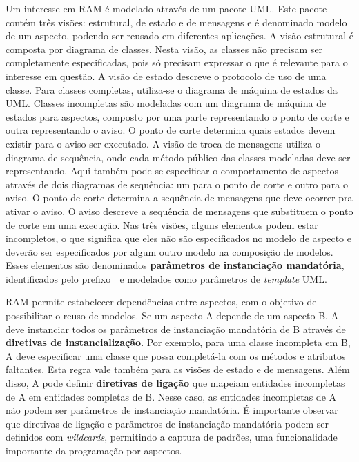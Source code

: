 Um interesse em RAM é modelado através de um pacote UML. Este pacote contém três visões: estrutural, de estado e de mensagens e é denominado modelo de
um aspecto, podendo ser reusado em diferentes aplicações. A visão estrutural é composta por diagrama de classes. Nesta visão, as classes não precisam
ser completamente especificadas, pois só precisam expressar o que é relevante para o interesse em questão. A visão de estado descreve o protocolo de
uso de uma classe. Para classes completas, utiliza-se o diagrama de máquina de estados da UML. Classes incompletas são modeladas com um diagrama de
máquina de estados para aspectos, composto por uma parte representando o ponto de corte e outra representando o aviso. O ponto de corte determina
quais estados devem existir para o aviso ser executado. A visão de troca de mensagens utiliza o diagrama de sequência, onde cada método público das
classes modeladas deve ser representando. Aqui também pode-se especificar o comportamento de aspectos através de dois diagramas de sequência:
um para o ponto de corte e outro para o aviso. O ponto de corte determina a sequência de mensagens que deve ocorrer pra ativar o aviso. O aviso
descreve a sequência de mensagens que substituem o ponto de corte em uma execução. Nas três visões, alguns elementos podem estar incompletos, o que
significa que eles não são especificados no modelo de aspecto e deverão ser especificados por algum outro modelo na composição de modelos. Esses
elementos são denominados \textbf{parâmetros de instanciação mandatória}, identificados pelo prefixo | e modelados como parâmetros de
\textit{template} UML.

RAM permite estabelecer dependências entre aspectos, com o objetivo de possibilitar o reuso de modelos. Se um aspecto A depende de um aspecto B, A
deve instanciar todos os parâmetros de instanciação mandatória de B através de \textbf{diretivas de instancialização}. Por exemplo, para uma
classe incompleta em B, A deve especificar uma classe que possa completá-la com os métodos e atributos faltantes. Esta regra vale também para as visões de
estado e de mensagens. Além disso, A pode definir \textbf{diretivas de ligação} que mapeiam entidades incompletas de A em entidades completas de B.
Nesse caso, as entidades incompletas de A não podem ser parâmetros de instanciação mandatória. É importante observar que diretivas de ligação e
parâmetros de instanciação mandatória podem ser definidos com \textit{wildcards}, permitindo a captura de padrões, uma funcionalidade
importante da programação por aspectos.

